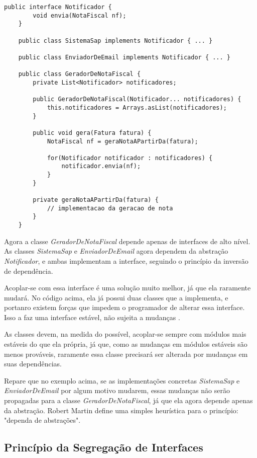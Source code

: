 \begin{lstlisting}[frame=trbl]
	public interface Notificador {
		void envia(NotaFiscal nf);
	}
	
	public class SistemaSap implements Notificador { ... }
	
	public class EnviadorDeEmail implements Notificador { ... }
	
	public class GeradorDeNotaFiscal {
		private List<Notificador> notificadores;
		
		public GeradorDeNotaFiscal(Notificador... notificadores) {
			this.notificadores = Arrays.asList(notificadores);
		}
		
		public void gera(Fatura fatura) {
			NotaFiscal nf = geraNotaAPartirDa(fatura);
			
			for(Notificador notificador : notificadores) {
				notificador.envia(nf);
			}
		}
		
		private geraNotaAPartirDa(fatura) {
			// implementacao da geracao de nota
		}
	}
\end{lstlisting}

Agora a classe \textit{GeradorDeNotaFiscal} depende apenas de interfaces de alto
nível. As classes \textit{SistemaSap} e \textit{EnviadorDeEmail} agora dependem
da abstração \textit{Notificador}, e ambas implementam a interface, seguindo o
princípio da inversão de dependência. 

Acoplar-se com essa interface é uma solução muito melhor, já que ela raramente
mudará. No código acima, ela já possui duas classes que a implementa, e portanro
existem forças que impedem o programador de alterar essa interface. Isso a
faz uma interface estável, não sujeita a mudanças \cite{bobmartin-oodmetrics}. 

As classes devem, na medida do possível, acoplar-se sempre com módulos mais
estáveis do que ela própria, já que, como as mudanças em módulos estáveis são
menos prováveis, raramente essa classe precisará ser alterada por mudanças em
suas dependências.

Repare que no exemplo acima, se as implementações concretas \textit{SistemaSap}
e \textit{EnviadorDeEmail} por algum motivo mudarem, essas mudanças não serão
propagadas para a classe \textit{GeradorDeNotaFiscal}, já que ela agora depende
apenas da abstração. Robert Martin define uma simples heurística para o
princípio: "dependa de abstrações".

\subsection{Princípio da Segregação de Interfaces}
\label{subsec:isp}

